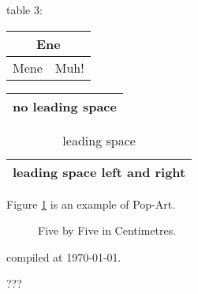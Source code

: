 \documentclass[a4paper,11pt, twoside]{article}
\begin{document}
table 3:
\begin{tabular}{|c|c|}
\hline
\multicolumn{2}{|c|}{Ene} \\
\hline
Mene & Muh! \\
\hline
\end{tabular}

\begin{tabular}{@{} l @{}}
\hline
no leading space\\
\hline
\end{tabular}


\begin{table}[!htp]
\begin{center}
\begin{tabular}{l}
\hline
leading space left and right\\
\hline
\end{tabular}
\caption{leading space}
\end{center}
\end{table}

Figure \ref{white} is an example of Pop-Art.
\begin{figure}[!htp]
\makebox[\textwidth]{\framebox[5cm]{\rule{0pt}{5cm}}}
\caption{Five by Five in Centimetres.\label{white}}
\end{figure}

compiled at \today.

\newpage


???
\end{document}
